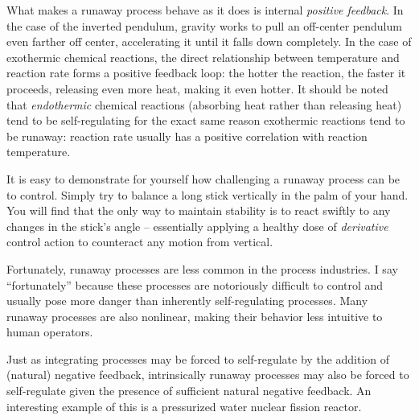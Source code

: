 What makes a runaway process behave as it does is internal \textit{positive feedback}.  In the case of the inverted pendulum, gravity works to pull an off-center pendulum even farther off center, accelerating it until it falls down completely.  In the case of exothermic chemical reactions, the direct relationship between temperature and reaction rate forms a positive feedback loop: the hotter the reaction, the faster it proceeds, releasing even more heat, making it even hotter.  It should be noted that \textit{endothermic} chemical reactions (absorbing heat rather than releasing heat) tend to be self-regulating for the exact same reason exothermic reactions tend to be runaway: reaction rate usually has a positive correlation with reaction temperature.  

It is easy to demonstrate for yourself how challenging a runaway process can be to control.  Simply try to balance a long stick vertically in the palm of your hand.  You will find that the only way to maintain stability is to react swiftly to any changes in the stick's angle -- essentially applying a healthy dose of \textit{derivative} control action to counteract any motion from vertical.

Fortunately, runaway processes are less common in the process industries.  I say ``fortunately'' because these processes are notoriously difficult to control and usually pose more danger than inherently self-regulating processes.  Many runaway processes are also nonlinear, making their behavior less intuitive to human operators.  

\vskip 10pt

\filbreak

Just as integrating processes may be forced to self-regulate by the addition of (natural) negative feedback, intrinsically runaway processes may also be forced to self-regulate given the presence of sufficient natural negative feedback.  An interesting example of this is a pressurized water nuclear fission reactor.  

